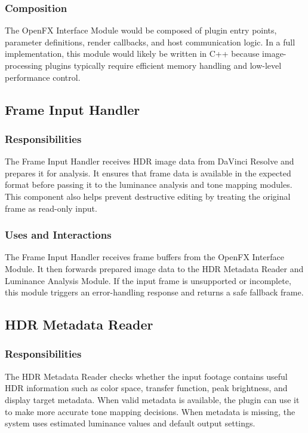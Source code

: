 \documentclass[12pt,hyphens]{article}
\begin{document}
\subsubsection{Composition}
The OpenFX Interface Module would be composed of plugin entry points, parameter definitions, render callbacks, and host communication logic. In a full implementation, this module would likely be written in C++ because image-processing plugins typically require efficient memory handling and low-level performance control.

\subsection{Frame Input Handler}

\subsubsection{Responsibilities}
The Frame Input Handler receives HDR image data from DaVinci Resolve and prepares it for analysis. It ensures that frame data is available in the expected format before passing it to the luminance analysis and tone mapping modules. This component also helps prevent destructive editing by treating the original frame as read-only input.

\subsubsection{Uses and Interactions}
The Frame Input Handler receives frame buffers from the OpenFX Interface Module. It then forwards prepared image data to the HDR Metadata Reader and Luminance Analysis Module. If the input frame is unsupported or incomplete, this module triggers an error-handling response and returns a safe fallback frame.

\subsection{HDR Metadata Reader}

\subsubsection{Responsibilities}
The HDR Metadata Reader checks whether the input footage contains useful HDR information such as color space, transfer function, peak brightness, and display target metadata. When valid metadata is available, the plugin can use it to make more accurate tone mapping decisions. When metadata is missing, the system uses estimated luminance values and default output settings.
\end{document}
